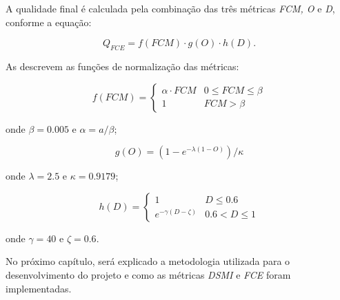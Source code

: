 \par A qualidade final é calculada pela combinação das três métricas \textit{FCM, O} e \textit{D}, conforme a equação:

\begin{equation} \label{eq:fce:Q}
    Q_{FCE} = f(FCM) \cdot g(O) \cdot h(D).
\end{equation}

As  descrevem as funções de normalização das métricas:

\begin{equation}\label{eq:fce:normFCM}
  f(FCM) =
  \begin{cases}
    \alpha \cdot FCM & 0 \leq FCM \leq \beta\\
    1  &  FCM > \beta
  \end{cases}
\end{equation}

\noindent onde $\beta = 0.005$ e $\alpha = a/\beta$;


\begin{equation}\label{eq:fce:normO}
  g(O) = (1 - e^{-\lambda(1 - O)})/\kappa
\end{equation}

\noindent onde $\lambda = 2.5$ e $\kappa = 0.9179$;

\begin{equation}\label{eq:fce:normD}
  h(D) =
  \begin{cases}
    1 & D \leq 0.6\\
    e^{-\gamma(D - \zeta)}  &  0.6 < D \leq 1
  \end{cases}
\end{equation}

\noindent onde $\gamma = 40$ e $\zeta = 0.6$.

\par No próximo capítulo, será explicado a metodologia utilizada para o desenvolvimento do projeto e como as métricas \textit{\acrshort{DSMI}} e \textit{\acrshort{FCE}} foram implementadas.